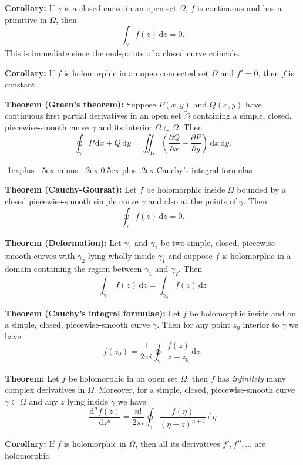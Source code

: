\documentclass[10pt,landscape]{article}
\makeatletter
\renewcommand{\subsection}{\@startsection{subsection}{2}{0mm}%
                                {-1explus -.5ex minus -.2ex}%
                                {0.5ex plus .2ex}%
                                {\normalfont\normalsize\bfseries}}
\makeatother
\begin{document}
\begin{multicols}{3}
\textbf{Corollary:} If $\gamma$ is a closed curve in an open set $\Omega$, $f$ is continuous and
has a primitive in $\Omega$, then $$\int_{\gamma} f(z)\, \text{d}z = 0.$$
This is immediate since the end-points of a closed curve coincide.

\textbf{Corollary:} If $f$ is holomorphic in an open connected set $\Omega$ and $f' = 0$,
then $f$ is constant.

\textbf{Theorem (Green's theorem):} Suppose $P(x, y)$ and $Q(x, y)$ have continuous
first partial derivatives in an open set $\widetilde{\Omega}$ containing a simple, closed,
piecewise-smooth curve $\gamma$ and its interior $\Omega \subset \widetilde{\Omega}.$ Then $$\oint_{\gamma} P \, \text{d}x + Q \, \text{d} y = \iint_{\Omega} \left(\frac{\partial Q}{\partial x} - \frac{\partial P}{\partial y}\right) \, \text{d}x\, \text{d}y.$$


\subsection{Cauchy's integral formulas}

\textbf{Theorem (Cauchy-Goursat):}
Let $f$ be holomorphic inside $\Omega$
bounded by a closed piecewise-smooth simple curve $\gamma$ and also at the points
of $\gamma$. Then
$$\oint_{\gamma} f(z) \, \text{d}z = 0.$$

\textbf{Theorem (Deformation):}
Let $\gamma_1$ and $\gamma_2$ be two simple, closed,
piecewise-smooth curves with $\gamma_2$ lying wholly inside $\gamma_1$ and suppose $f$ is
holomorphic in a domain containing the region between $\gamma_1$ and $\gamma_2$. Then
$$\int_{\gamma_1} f(z) \, \text{d}z = \int_{\gamma_2} f(z) \, \text{d}z  $$

\textbf{Theorem (Cauchy’s integral formulae):}
Let $f$ be holomorphic inside and on a simple, closed,
piecewise-smooth curve $\gamma$. Then for any point $z_0$ interior to $\gamma$ we have
$$f(z_0) = \frac{1}{2 \pi i} \oint_{\gamma} \frac{f(z)}{z - z_0} \, \text{d}z.$$

\textbf{Theorem:} Let $f$ be holomorphic in an open set $\Omega$, then $f$ has \textit{infinitely}
many complex derivatives in $\Omega$. Moreover, for a simple, closed, piecewise-smooth
curve $\gamma \subset \Omega$ and any $z$ lying inside $\gamma$ we have
$$\frac{\text{d}^n f(z)}{\text{d}z^n} = \frac{n!}{2 \pi i} \oint_{\gamma} \frac{f(\eta)}{(\eta - z)^{n+1}} \, \text{d}\eta$$

\textbf{Corollary:} If $f$ is holomorphic in $\Omega$, then all its derivatives $f',f'', \ldots $ are holomorphic.


\end{multicols}
\end{document}
